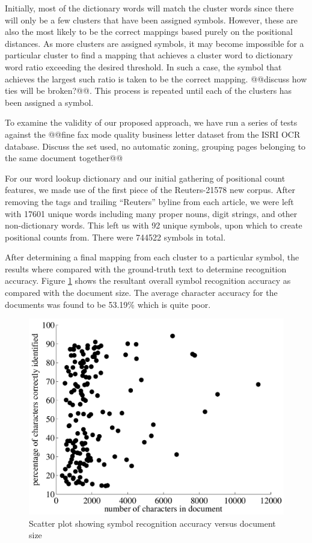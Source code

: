 \documentclass[times, 10pt,twocolumn]{article}
\begin{document}
Initially, most of the dictionary words will match the cluster words since there
will only be a few clusters that have been assigned symbols.  However, these 
are also the most likely to be the correct mappings based purely on the
positional distances.  As more clusters are assigned symbols, it may become
impossible for a particular cluster to find a mapping that achieves a cluster
word to dictionary word ratio exceeding the desired threshold.  In such a case,
the symbol that achieves the largest such ratio is taken to be the correct
mapping.  @@discuss how ties will be broken?@@.  This process is repeated until
each of the clusters has been assigned a symbol.



To examine the validity of our proposed approach, we have run a series of tests
against the @@fine fax mode quality business letter dataset from the ISRI OCR
database\cite{nartker2005}.  Discuss the set used, no automatic zoning,
grouping pages belonging to the same document together@@

For our word lookup dictionary and our initial gathering of positional count
features, we made use of the first piece of the Reuters-21578 new
corpus\cite{lewis2004}.  After removing the tags and trailing ``Reuters''
byline from each article, we were left with 17601 unique words including many
proper nouns, digit strings, and other non-dictionary words.  This left us with
92 unique symbols, upon which to create positional counts from.  There were
744522 symbols in total.

After determining a final mapping from each cluster to a particular symbol, the
results where compared with the ground-truth text to determine recognition
accuracy.  Figure \ref{characc_fig} shows the resultant overall symbol
recognition accuracy as compared with the document size.  The average character
accuracy for the documents was found to be 53.19\% which is quite poor.

\begin{figure}[ht]
  \centering
  \includegraphics[scale=.4]{figures/character_accuracy}
  \caption{Scatter plot showing symbol recognition accuracy versus document
  size}
  \label{characc_fig}
\end{figure}
\end{document}
